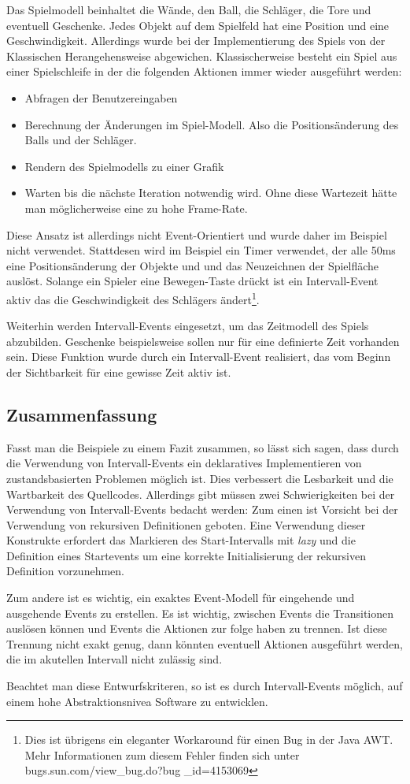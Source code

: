 Das Spielmodell beinhaltet die Wände, den Ball, die Schläger, die Tore und
eventuell Geschenke. Jedes Objekt auf dem Spielfeld hat eine Position und eine
Geschwindigkeit. Allerdings wurde bei der Implementierung des Spiels von der
Klassischen Herangehensweise abgewichen. Klassischerweise besteht ein Spiel aus
einer Spielschleife in der die folgenden Aktionen immer wieder ausgeführt
werden:
\begin{itemize}
  \item Abfragen der Benutzereingaben
  \item Berechnung der Änderungen im Spiel-Modell. Also die Positionsänderung
  des Balls und der Schläger.
  \item Rendern des Spielmodells zu einer Grafik
  \item Warten bis die nächste Iteration notwendig wird. Ohne diese Wartezeit
  hätte man möglicherweise eine zu hohe Frame-Rate.
\end{itemize}


Diese Ansatz ist allerdings nicht Event-Orientiert und wurde daher im Beispiel
nicht verwendet. Stattdesen wird im Beispiel ein Timer verwendet, der alle 50ms
eine Positionsänderung der Objekte und und das Neuzeichnen der Spielfläche auslöst.
Solange ein Spieler eine Bewegen-Taste drückt ist ein Intervall-Event aktiv das
die Geschwindigkeit des Schlägers ändert\footnote{Dies ist übrigens ein
eleganter Workaround für einen Bug in der Java AWT. Mehr Informationen zum
diesem Fehler finden sich unter
bugs.sun.com/view\_bug.do?bug \_id=4153069}.

Weiterhin werden Intervall-Events eingesetzt, um das Zeitmodell des Spiels
abzubilden. Geschenke beispielsweise sollen nur für eine definierte Zeit
vorhanden sein. Diese Funktion wurde durch ein Intervall-Event realisiert, das
vom Beginn der Sichtbarkeit für eine gewisse Zeit aktiv ist. 

\subsection{Zusammenfassung}
Fasst man die Beispiele zu einem Fazit zusammen, so lässt sich sagen, dass durch
die Verwendung von Intervall-Events ein deklaratives Implementieren von
zustandsbasierten Problemen möglich ist. Dies verbessert die Lesbarkeit und die
Wartbarkeit des Quellcodes. Allerdings gibt müssen zwei Schwierigkeiten bei der
Verwendung von Intervall-Events bedacht werden: Zum einen ist Vorsicht bei der
Verwendung von rekursiven Definitionen geboten. Eine Verwendung dieser
Konstrukte erfordert das Markieren des Start-Intervalls mit \textit{lazy} und
die Definition eines Startevents um eine korrekte Initialisierung der rekursiven
Definition vorzunehmen.

Zum andere ist es wichtig, ein exaktes Event-Modell für eingehende und
ausgehende Events zu erstellen. Es ist wichtig, zwischen Events die Transitionen
auslösen können und Events die Aktionen zur folge haben zu trennen. Ist diese
Trennung nicht exakt genug, dann könnten eventuell Aktionen ausgeführt werden,
die im akutellen Intervall nicht zulässig sind. 

Beachtet man diese Entwurfskriteren, so ist es durch Intervall-Events möglich,
auf einem hohe Abstraktionsnivea Software zu entwicklen. 
